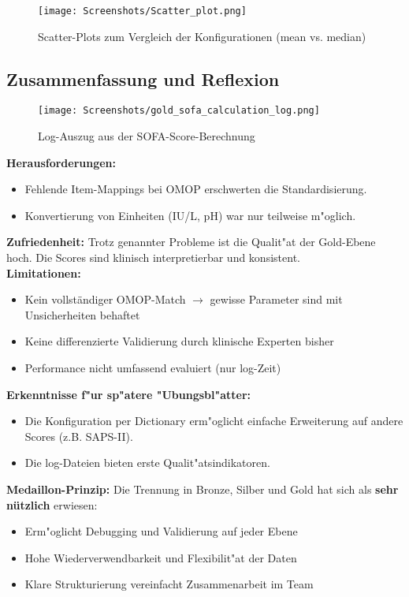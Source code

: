 \documentclass[12pt]{article}
\begin{document}
\begin{figure}[H]
    \centering
    \texttt{[image: Screenshots/Scatter\_plot.png]}
    \caption{Scatter-Plots zum Vergleich der Konfigurationen (mean vs. median)}
\end{figure}



\subsection{Zusammenfassung und Reflexion}

\begin{figure}[htbp]
\centering
\texttt{[image: Screenshots/gold\_sofa\_calculation\_log.png]}
\caption{Log-Auszug aus der SOFA-Score-Berechnung}
\label{fig:hr_high}
\end{figure}

\textbf{Herausforderungen:}
\begin{itemize}
\item Fehlende Item-Mappings bei OMOP erschwerten die Standardisierung.
\item Konvertierung von Einheiten (IU/L, pH) war nur teilweise m"oglich.
\end{itemize}

\noindent
\textbf{Zufriedenheit:} Trotz genannter Probleme ist die Qualit"at der Gold-Ebene hoch. Die Scores sind klinisch interpretierbar und konsistent.\\

\noindent
\newpage
\textbf{Limitationen:}
\begin{itemize}
\item Kein vollständiger OMOP-Match $\rightarrow$ gewisse Parameter sind mit Unsicherheiten behaftet
\item Keine differenzierte Validierung durch klinische Experten bisher
\item Performance nicht umfassend evaluiert (nur log-Zeit)
\end{itemize}

\noindent
\textbf{Erkenntnisse f"ur sp"atere "Ubungsbl"atter:}
\begin{itemize}
\item Die Konfiguration per Dictionary erm"oglicht einfache Erweiterung auf andere Scores (z.B. SAPS-II).
\item Die log-Dateien bieten erste Qualit"atsindikatoren.
\end{itemize}

\noindent
\textbf{Medaillon-Prinzip:} Die Trennung in Bronze, Silber und Gold hat sich als \textbf{sehr nützlich} erwiesen:
\begin{itemize}
\item Erm"oglicht Debugging und Validierung auf jeder Ebene
\item Hohe Wiederverwendbarkeit und Flexibilit"at der Daten
\item Klare Strukturierung vereinfacht Zusammenarbeit im Team
\end{itemize}
\end{document}
